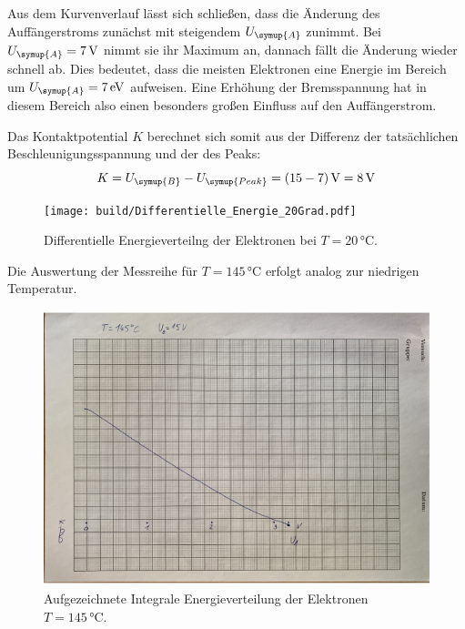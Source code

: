 Aus dem Kurvenverlauf lässt sich schließen, dass die Änderung des Auffängerstroms zunächst mit steigendem $U_{\symup{A}}$ zunimmt.
Bei $U_{\symup{A}}=7\,\unit{\volt}$ nimmt sie ihr Maximum an, dannach fällt die Änderung wieder schnell ab.
Dies bedeutet, dass die meisten Elektronen eine Energie im Bereich um $U_{\symup{A}}=7\,\unit{\electronvolt}$ aufweisen.
Eine Erhöhung der Bremsspannung hat in diesem Bereich also einen besonders großen Einfluss auf den Auffängerstrom.

Das Kontaktpotential $K$ berechnet sich somit aus der Differenz der tatsächlichen Beschleunigungsspannung und der des Peaks:
\begin{equation*}
  K=U_{\symup{B}}-U_{\symup{Peak}}=(15-7)\,\unit{\volt}=8\,\unit{\volt}
\end{equation*}

\begin{figure}[H]
    \centering
    \texttt{[image: build/Differentielle\_Energie\_20Grad.pdf]}
    \caption{Differentielle Energieverteilng der Elektronen bei $T=20\,\unit{\celsius}$.}
    \label{fig:Diff Energie 20Grad}
\end{figure}

Die Auswertung der Messreihe für $T=145\,\unit{\celsius}$ erfolgt analog zur niedrigen Temperatur.

\begin{figure}[H]
  \centering
  \includegraphics[height=8cm]{content/pics/originaldaten/2.pdf}
  \caption{Aufgezeichnete Integrale Energieverteilung der Elektronen $T=145\,\unit{\celsius}$.}
  \label{fig:Int Energie 145 Grad}
\end{figure}

